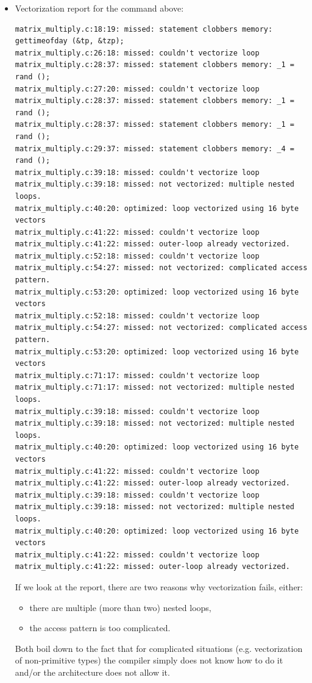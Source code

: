 \documentclass[a4paper]{article}
\begin{document}
\begin{itemize}
    \item Vectorization report for the command above:
\begin{verbatim}
matrix_multiply.c:18:19: missed: statement clobbers memory: gettimeofday (&tp, &tzp);
matrix_multiply.c:26:18: missed: couldn't vectorize loop
matrix_multiply.c:28:37: missed: statement clobbers memory: _1 = rand ();
matrix_multiply.c:27:20: missed: couldn't vectorize loop
matrix_multiply.c:28:37: missed: statement clobbers memory: _1 = rand ();
matrix_multiply.c:28:37: missed: statement clobbers memory: _1 = rand ();
matrix_multiply.c:29:37: missed: statement clobbers memory: _4 = rand ();
matrix_multiply.c:39:18: missed: couldn't vectorize loop
matrix_multiply.c:39:18: missed: not vectorized: multiple nested loops.
matrix_multiply.c:40:20: optimized: loop vectorized using 16 byte vectors
matrix_multiply.c:41:22: missed: couldn't vectorize loop
matrix_multiply.c:41:22: missed: outer-loop already vectorized.
matrix_multiply.c:52:18: missed: couldn't vectorize loop
matrix_multiply.c:54:27: missed: not vectorized: complicated access pattern.
matrix_multiply.c:53:20: optimized: loop vectorized using 16 byte vectors
matrix_multiply.c:52:18: missed: couldn't vectorize loop
matrix_multiply.c:54:27: missed: not vectorized: complicated access pattern.
matrix_multiply.c:53:20: optimized: loop vectorized using 16 byte vectors
matrix_multiply.c:71:17: missed: couldn't vectorize loop
matrix_multiply.c:71:17: missed: not vectorized: multiple nested loops.
matrix_multiply.c:39:18: missed: couldn't vectorize loop
matrix_multiply.c:39:18: missed: not vectorized: multiple nested loops.
matrix_multiply.c:40:20: optimized: loop vectorized using 16 byte vectors
matrix_multiply.c:41:22: missed: couldn't vectorize loop
matrix_multiply.c:41:22: missed: outer-loop already vectorized.
matrix_multiply.c:39:18: missed: couldn't vectorize loop
matrix_multiply.c:39:18: missed: not vectorized: multiple nested loops.
matrix_multiply.c:40:20: optimized: loop vectorized using 16 byte vectors
matrix_multiply.c:41:22: missed: couldn't vectorize loop
matrix_multiply.c:41:22: missed: outer-loop already vectorized.
\end{verbatim}

    If we look at the report, there are two reasons why 
    vectorization fails, either:

    \begin{itemize}
        \setlength\itemsep{0.01em}
        \item there are  multiple (more than two) nested loops,
        \item the access pattern is too complicated.
    \end{itemize}

    Both boil down to the fact that for complicated situations (e.g. vectorization of non-primitive types) the compiler simply does not know how to do it and/or the architecture does not allow it.
\end{itemize}

\end{document}
